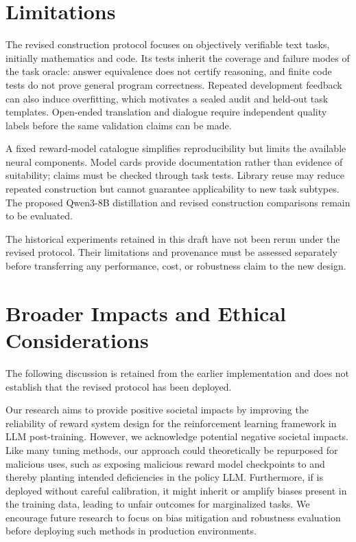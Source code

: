 
\section{Limitations}

The revised construction protocol focuses on objectively verifiable text tasks, initially mathematics and code. Its tests inherit the coverage and failure modes of the task oracle: answer equivalence does not certify reasoning, and finite code tests do not prove general program correctness. Repeated development feedback can also induce overfitting, which motivates a sealed audit and held-out task templates. Open-ended translation and dialogue require independent quality labels before the same validation claims can be made.

A fixed reward-model catalogue simplifies reproducibility but limits the available neural components. Model cards provide documentation rather than evidence of suitability; claims must be checked through task tests. Library reuse may reduce repeated construction but cannot guarantee applicability to new task subtypes. The proposed Qwen3-8B distillation and revised construction comparisons remain to be evaluated.

The historical experiments retained in this draft have not been rerun under the revised protocol. Their limitations and provenance must be assessed separately before transferring any performance, cost, or robustness claim to the new design.

\section{Broader Impacts and Ethical Considerations}
\label{sec:impact_ethic}


The following discussion is retained from the earlier implementation and does not establish that the revised protocol has been deployed.

Our research aims to provide positive societal impacts by improving the reliability of reward system design for the reinforcement learning framework in LLM post-training. However, we acknowledge potential negative societal impacts. Like many tuning methods, our approach could theoretically be repurposed for malicious uses, such as exposing malicious reward model checkpoints to \method{} and thereby planting intended deficiencies in the policy LLM.
Furthermore, if \method{} is deployed without careful calibration, it might inherit or amplify biases present in the training data, leading to unfair outcomes for marginalized tasks. We encourage future research to focus on bias mitigation and robustness evaluation before deploying such methods in production environments.

